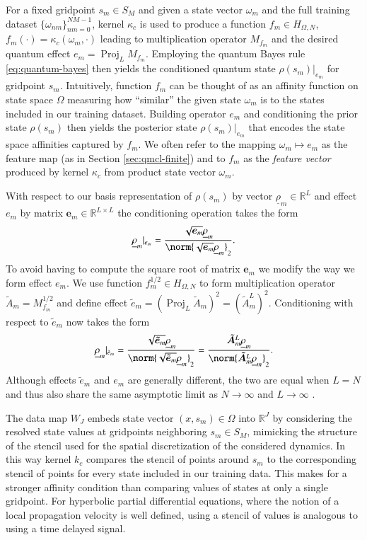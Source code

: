 \documentclass[letterpaper,10pt,3p,preprint]{elsarticle}
\newcommand{\Rbb}{\mathbb{R}}
\DeclareMathOperator{\Proj}{Proj}
\newcommand{\vect}[1]{\underline{#1}}
\newcommand{\matr}[1]{\bm{#1}}
\begin{document}
For a fixed gridpoint $s_m\in S_M$ and given a
state vector $\omega_m$ and the full training dataset
$\{\omega_{nm}\}_{nm=0}^{NM-1}$,
kernel $\kappa_c$ is used to produce a function
$f_m\in H_{\Omega,N}$,
$f_m(\cdot)=\kappa_c(\omega_m,\cdot)$
leading to multiplication operator $M_{f_m}$
and the desired quantum effect $e_m=\Proj_LM_{f_m}$.
Employing the quantum Bayes rule \eqref{eq:quantum-bayes}
then yields the conditioned quantum state
$\rho(s_m)|_{e_m}$ for gridpoint $s_m$.
Intuitively, function $f_m$ can be thought of as an affinity function
on state space $\Omega$ measuring how ``similar'' the given
state $\omega_m$ is to the states included in our training dataset.
Building operator $e_m$ and conditioning the prior state
$\rho(s_m)$ then yields the posterior state $\rho(s_m)|_{e_m}$
that encodes the state space affinities captured by $f_m$.
We often refer to the mapping $\omega_m\mapsto e_m$ as the
feature map (as in Section \ref{sec:qmcl-finite})
and to $f_m$ as the \emph{feature vector}
produced by kernel $\kappa_c$ from product state vector
$\omega_m$.

With respect to our basis representation of $\rho(s_m)$
by vector $\vect{\rho}_m\in\Rbb^L$
and effect $e_m$ by matrix $\matr{e}_m\in\Rbb^{L\times L}$
the conditioning operation takes the form
\begin{equation*}
    \vect{\rho}_m|_{e_m}=\frac{\sqrt{\matr{e}_m}\vect{\rho}_m}
        {\norm{\sqrt{\matr{e}_m}\vect{\rho}_m}_2}.
\end{equation*}
To avoid having to compute the square root of matrix $\matr{e}_m$
we modify the way we form effect $e_m$.
We use function $f_m^{1/2}\in H_{\Omega,N}$
to form multiplication operator $\tilde{A}_m=M_{f_m}^{1/2}$
and define effect
$\tilde{e}_m=(\Proj_L\tilde{A}_m)^2=(\tilde{A}_m^L)^2$.
Conditioning with respect to $\tilde{e}_m$ now takes the form
\begin{equation*}
    \vect{\rho}_m|_{\tilde{e}_m}
        =\frac{\sqrt{\matr{\tilde{e}}_m}\vect{\rho}_m}
        {\norm{\sqrt{\matr{\tilde{e}}_m}\vect{\rho}_m}_2}
        =\frac{\matr{\tilde{A}}_m^L\vect{\rho}_m}
        {\norm{\matr{\tilde{A}}_m^L\vect{\rho}_m}_2}.
\end{equation*}
Although effects $\tilde{e}_m$ and $e_m$ are generally different,
the two are equal when $L=N$ and thus also share the same
asymptotic limit as $N\rightarrow\infty$
and $L\rightarrow\infty$
\cite{Freeman2024}.

The data map $W_J$ embeds state vector $(x,s_m)\in\Omega$
into $\Rbb^J$ by considering the resolved state values at
gridpoints neighboring $s_m\in S_M$,
mimicking the structure of the stencil used for the spatial
discretization of the considered dynamics.
In this way kernel $k_c$ compares the stencil of points
around $s_m$ to the corresponding stencil of points for
every state included in our training data.
This makes for a stronger affinity condition than comparing values
of states at only a single gridpoint.
For hyperbolic partial differential equations, where the notion of a
local propagation velocity is well defined, using a stencil of values
is analogous to using a time delayed signal.
\end{document}
